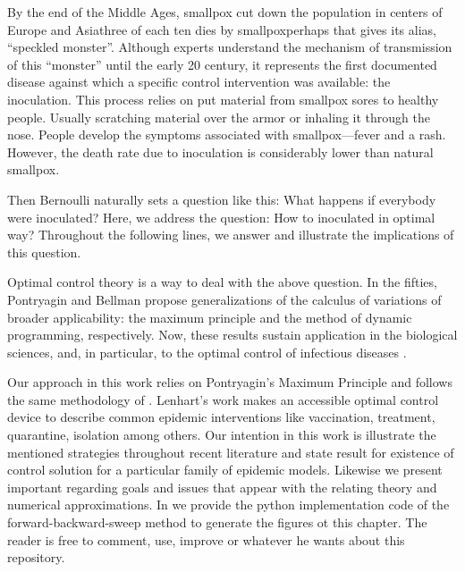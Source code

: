   By the end of the Middle Ages, smallpox cut down the 
population in centers of Europe and Asia\textemdash three of each ten dies by 
smallpox\textemdash perhaps that gives its alias, ``speckled monster''.  
Although experts understand the mechanism of transmission of this  ``monster''
until the early 20  century, it represents the first documented disease
\citep[][]{bernoulli1760essai, bradley1971smallpox, Foppa2017} against which a
specific control intervention was available: the inoculation. This process
relies on put material from smallpox sores to healthy people. Usually scratching
material over the armor or inhaling it through the nose. People develop the
symptoms associated with smallpox---fever and a rash. However, the death rate
due to inoculation is considerably lower than natural smallpox.

  Then Bernoulli naturally sets a question like this: What happens if everybody
were inoculated? Here, we address the question: How to inoculated in optimal
way? Throughout the following lines, we answer and illustrate the
implications of this question. 

  Optimal control theory is a way to deal with the above question.  In the
fifties, Pontryagin and Bellman propose generalizations of the calculus of
variations of broader applicability:  the maximum principle and the method of
dynamic programming, respectively. Now, these results sustain application in the
biological sciences, and, in particular, to the optimal control
of infectious diseases \cite{}.

  Our approach in this work relies on Pontryagin's Maximum
Principle \cite{pontryagin1962} and follows the same methodology of
\citet{lenhart2007optimal}. Lenhart's work makes an accessible optimal control
device to describe common epidemic interventions like vaccination, treatment,
quarantine, isolation among others. Our intention in this work is illustrate
the mentioned strategies throughout recent literature and state result for
existence of control solution for a particular family of epidemic models.
Likewise we present  important regarding goals and issues that appear with the
relating theory and numerical approximations. In \cite{python_repo} we provide 
the python implementation code of the forward-backward-sweep method  to generate
the figures ot this chapter. The reader is free to comment, use, improve or 
whatever he wants about this repository.


























